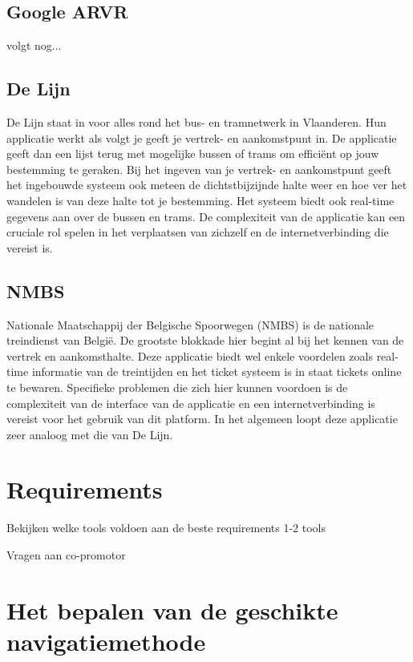 \subsection{Google ARVR}
\label{sec:google-arvr}

volgt nog...

\subsection{De Lijn}
\label{sec:de-lijn}

De Lijn staat in voor alles rond het bus- en tramnetwerk in Vlaanderen. Hun applicatie werkt als volgt je geeft je vertrek- en aankomstpunt in. De applicatie geeft dan een lijst terug met mogelijke bussen of trams om efficiënt op jouw bestemming te geraken. Bij het ingeven van je vertrek- en aankomstpunt geeft het ingebouwde systeem ook meteen de dichtstbijzijnde halte weer en hoe ver het wandelen is van deze halte tot je bestemming. Het systeem biedt ook real-time gegevens aan over de bussen en trams. De complexiteit van de applicatie kan een cruciale rol spelen in het verplaatsen van zichzelf en de internetverbinding die vereist is.

\subsection{NMBS}
\label{sec:nmbs}

Nationale Maatschappij der Belgische Spoorwegen (NMBS) is de nationale treindienst van België. De grootste blokkade hier begint al bij het kennen van de vertrek en aankomsthalte. Deze applicatie biedt wel enkele voordelen zoals real-time informatie van de treintijden en het ticket systeem is in staat tickets online te bewaren. Specifieke problemen die zich hier kunnen voordoen is de complexiteit van de interface van de applicatie en een internetverbinding is vereist voor het gebruik van dit platform. In het algemeen loopt deze applicatie zeer analoog met die van De Lijn.

\section{Requirements}
\label{sec:requirements}

Bekijken welke tools voldoen aan de beste requirements 1-2 tools

Vragen aan co-promotor


\section{Het bepalen van de geschikte navigatiemethode}
\label{sec:bepalen-geschikte-navigatiemethode}

